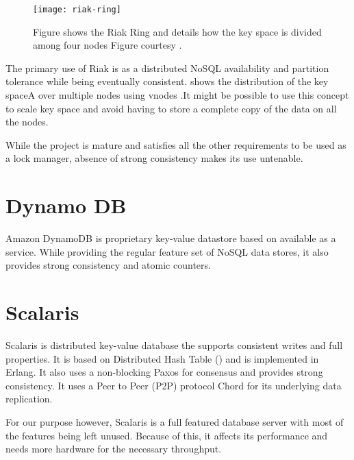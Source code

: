 \begin{figure}
  \texttt{[image: riak-ring]}
  \caption[Riak Ring]{%
    Figure shows the Riak Ring and details how the key space is divided among
    four nodes
    Figure courtesy \citet{riak}.}
  \label{figure:riak.ring}
\end{figure}

The primary use of Riak is as a distributed NoSQL%
availability and partition tolerance while
being eventually consistent.  shows the distribution of the
key spaceA over multiple nodes using vnodes%
.It might be possible to use this concept to scale key space and avoid having
to store a complete copy of the data on all the nodes.

While the project is mature and satisfies all
the other requirements to be used as a lock manager, absence of strong
consistency makes its use untenable.

\section{Dynamo DB}

Amazon DynamoDB \citep{dynamoDB} is proprietary key-value datastore based on
\citet{DeCandia07} available as a service. While providing the regular
feature set of NoSQL data stores, it also provides strong consistency and
atomic counters.

\section{Scalaris}

Scalaris \citep{scalaris} is distributed key-value database the supports
consistent writes and full  properties. It is based on Distributed 
Hash Table ()%
and is implemented in Erlang. It also uses a non-blocking Paxos for consensus
and provides strong consistency. It uses a Peer to Peer (P2P) protocol \dash{}
Chord \citep{StoicaMKKB01} for its underlying data replication. 

For our purpose however, Scalaris is a full featured database server with most
of the features being left unused. Because of this, it affects its performance
and needs more hardware for the necessary throughput.

